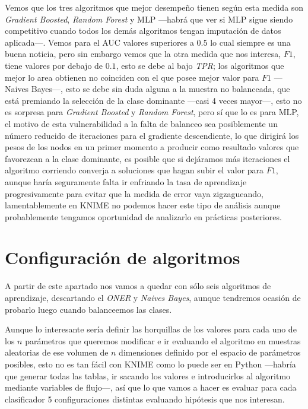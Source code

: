 \documentclass{article}
\begin{document}
Vemos que los tres algoritmos que mejor desempeño tienen según esta medida son \textit{Gradient Boosted}, \textit{Random Forest} y {MLP} ---habrá que ver si MLP sigue siendo competitivo cuando todos los demás algoritmos tengan imputación de datos aplicada---. Vemos para el AUC valores superiores a $0.5$ lo cual siempre es una buena noticia, pero sin embargo vemos que la otra medida que nos interesa, $F1$, tiene valores por debajo de $0.1$, esto se debe al bajo \textit{TPR}; los algoritmos que mejor lo area obtienen no coinciden con el que posee mejor valor para $F1$ ---Naives Bayes---, esto se debe sin duda alguna a la muestra no balanceada, que está premiando la selección de la clase dominante ---casi 4 veces mayor---, esto no es sorpresa para \textit{Gradient Boosted }y \textit{Random Forest}, pero sí que lo es para MLP, el motivo de esta vulnerabilidad a la falta de balanceo sea posiblemente un número reducido de iteraciones para el gradiente descendiente, lo que dirigirá los pesos de los nodos en un primer momento a producir como resultado valores que favorezcan a la clase dominante, es posible que si dejáramos más iteraciones el algoritmo corriendo converja a  soluciones que hagan subir el valor para $F1$, aunque haría seguramente falta ir enfriando la tasa de aprendizaje progresivamente para evitar que la medida de error vaya zigzagueando, lamentablemente en KNIME no podemos hacer este tipo de análisis aunque probablemente tengamos oportunidad de analizarlo en prácticas posteriores.

\section{Configuración de algoritmos}

A partir de este apartado nos vamos a quedar con sólo seis algoritmos de aprendizaje, descartando el \textit{ONER} y \textit{Naives Bayes}, aunque tendremos ocasión de probarlo luego cuando balanceemos las clases.

Aunque lo interesante sería definir las horquillas de los valores para cada uno de los $n$ parámetros que queremos modificar e ir evaluando el algoritmo en muestras aleatorias de ese volumen de $n$ dimensiones definido por el espacio de parámetros posibles, esto no es tan fácil con KNIME como lo puede ser en Python ---habría que generar todas las tablas, ir sacando los valores e introducirlos al algoritmo mediante variables de flujo---, así que lo que vamos a hacer es evaluar para cada clasificador 5 configuraciones distintas evaluando hipótesis que nos interesan.
\end{document}
